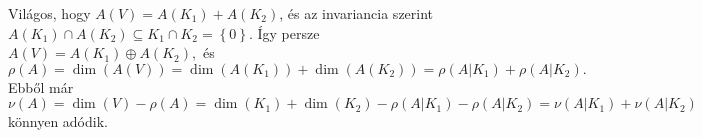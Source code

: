 \documentclass[a4paper, showtrims]{memoir}
\makeatletter
\renewenvironment{proof}[1][\proofname]
    {\par\pushQED{\qed}%
    \normalfont \topsep6\p@\@plus6\p@\relax
    \trivlist
    \item[\hskip\labelsep
        \itshape
    #1\@addpunct{:}]\ignorespaces}
    {\popQED\endtrivlist\@endpefalse}
\theoremstyle{plain}
\theoremstyle{remark}
\theoremstyle{definition}
\makeatother
\begin{document}
\begin{proof}
	Világos, hogy $A\left( V \right)=A\left( K_1 \right)+A\left( K_2 \right)$, és az
	invariancia szerint $A\left( K_1 \right)\cap A\left( K_2 \right)\subseteq K_1\cap K_2=\left\{ 0 \right\}$.
	Így persze
	\(
	A\left( V \right)=A\left( K_1 \right)\oplus A\left( K_2 \right),
	\)
	és
	\[
		\rho\left( A \right)=
		\dim\left( A\left( V \right) \right)
		=
		\dim \left( A\left( K_1 \right) \right)+
		\dim \left( A\left( K_2 \right) \right)
		=
		\rho\left( A|K_1 \right)+\rho\left( A|K_2 \right).
	\]
	Ebből már
	\[
		\nu\left( A \right)
		=
		\dim\left( V \right)-\rho\left( A \right)
		=\dim\left( K_1 \right)+\dim\left( K_2 \right)-\rho\left( A|K_1 \right)-\rho\left( A|K_2 \right)
		=
		\nu\left( A|K_1 \right)+\nu\left( A|K_2 \right)
	\]
	könnyen adódik.
\end{proof}
\end{document}
